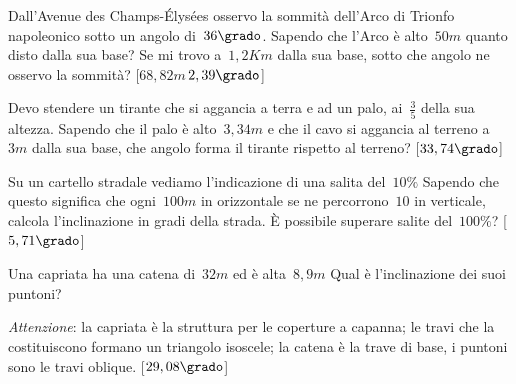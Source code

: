 \begin{multicols}{2}
\begin{esercizio}[\Ast]
\label{ese:G.62}
Dall'Avenue des Champs-Élysées osservo la sommità dell'Arco di Trionfo 
napoleonico sotto un angolo di~\(36\grado\).
Sapendo che l'Arco è alto~\(50\unit{m}\) quanto disto dalla sua base? Se mi trovo 
a~\(1,2\unit{Km}\) dalla sua base,
sotto che angolo ne osservo la sommità?
\hfill [\(68,82\unit{m}\)\,\(2,39\grado\)]
\end{esercizio}

\begin{esercizio}[\Ast]
\label{ese:G.63}
Devo stendere un tirante che si aggancia a terra e ad un palo, ai~\(\frac{3}{5}\) 
della sua altezza.
Sapendo che il palo è alto~\(3,34\unit{m}\) e che il cavo si aggancia al terreno 
a~\(3\unit{m}\) dalla sua base,
che angolo forma il tirante rispetto al terreno?
\hfill [\(33,74\grado\)]
\end{esercizio}

\begin{esercizio}[\Ast]
\label{ese:G.64}
Su un cartello stradale vediamo l'indicazione di una salita del~\(10\%\) Sapendo 
che questo significa che ogni~\(100\unit{m}\)
in orizzontale se ne percorrono~\(10\) in verticale, calcola l'inclinazione in 
gradi della strada. È possibile superare salite del~\(100\%\)?
\hfill [\(5,71\grado\)]
\end{esercizio}

\begin{esercizio}[\Ast]
\label{ese:G.65}
Una capriata ha una catena di~\(32\unit{m}\) ed è alta~\(8,9\unit{m}\) Qual è 
l'inclinazione dei suoi puntoni?

\emph{Attenzione}: la capriata è la struttura per le coperture a 
{\textquotedbl}capanna{\textquotedbl}; le travi che la costituiscono
formano un triangolo isoscele; la catena è la trave di base, i puntoni sono le 
travi oblique.
\hfill [\(29,08\grado\)]
\end{esercizio}

% 
\end{multicols}


